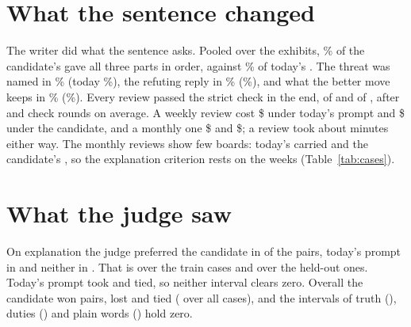 \documentclass[11pt]{article}
\begin{document}
\begin{table}[h]
\centering
\small\RuleTable
\caption{The rule, fixed before the candidate's first run. Explanation and overall are the judge's
scores per case; the claim rows are the audit's counts per review, candidate minus today's prompt,
over all \Cases{} cases.}
\label{tab:rule}
\end{table}

\section{What the sentence changed}

The writer did what the sentence asks. Pooled over the exhibits, \CandFullOrder\% of the
candidate's \CandExhibits{} gave all three parts in order, against \BaseFullOrder\% of today's
\BaseExhibits. The threat was named in \CandThreat\% (today \BaseThreat\%), the refuting reply in
\CandRefutation\% (\BaseRefutation\%), and what the better move keeps in \CandKeeps\%
(\BaseKeeps\%). Every review passed the strict check in the end, \BasePassed{} of \BaseRuns{} and
\CandPassed{} of \CandRuns, after \BaseRounds{} and \CandRounds{} check rounds on average. A weekly
review cost \$\BaseWeekCost{} under today's prompt and \$\CandWeekCost{} under the candidate, and a
monthly one \$\BaseMonthCost{} and \$\CandMonthCost; a review took about \BaseMinutes{} minutes
either way. The monthly reviews show few boards: today's \BaseMonthRuns{} carried
\BaseMonthBoards{} and the candidate's \CandMonthBoards, so the explanation criterion rests on the weeks
(Table~\ref{tab:cases}).

\begin{table}[h]
\centering
\small\CaseTable
\caption{Each period: its games, the exhibits that give all three parts in order (over all of a
prompt's runs of the period), and the judge's verdict on each pair, from the candidate's side ($+$ it
wins, $-$ it loses, $0$ a tie).}
\label{tab:cases}
\end{table}

\section{What the judge saw}

On explanation the judge preferred the candidate in \ExplWins{} of the \CandPairs{} pairs, today's
prompt in \ExplLosses{} and neither in \ExplTies. That is \TrainExplanation{} over the train cases
and \HeldExplanation{} over the held-out ones. Today's prompt took \TrainLossCases{} and
\HeldTieCases{} tied, so neither interval clears zero. Overall the candidate won \OverallWins{}
pairs, lost \OverallLosses{} and tied \OverallTies{} (\AllOverall{} over all \Cases{} cases), and
the intervals of truth (\AllTruth), duties (\AllDuties) and plain words (\AllPlain) hold zero.
\end{document}

